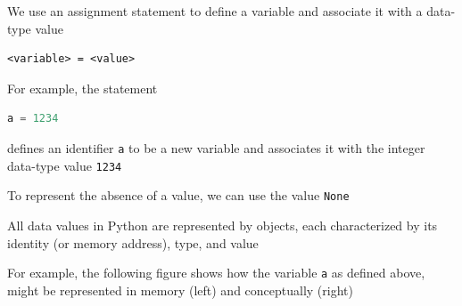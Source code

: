 \documentclass[8pt,a4paper,compress]{beamer}
\begin{document}
\begin{frame}[fragile]
\pause

We use an assignment statement to define a variable and associate it with a data-type value

\smallskip

\begin{lstlisting}[language={},style=focusin]
<variable> = <value>
\end{lstlisting}

\pause\bigskip

For example, the statement 

\smallskip

\begin{lstlisting}[language=Python,style=focusin]
a = 1234
\end{lstlisting}

\smallskip

defines an identifier \lstinline{a} to be a new variable and associates it with the integer data-type value \lstinline{1234}

\pause\bigskip

To represent the absence of a value, we can use the value \lstinline{None}

\pause\bigskip

All data values in Python are represented by objects, each characterized by its identity (or memory address), type, and value

\pause\bigskip

For example, the following figure shows how the variable \lstinline{a} as defined above, might be represented in memory (left) and conceptually (right) 
\begin{center}
\end{center}
\end{frame}
\end{document}
